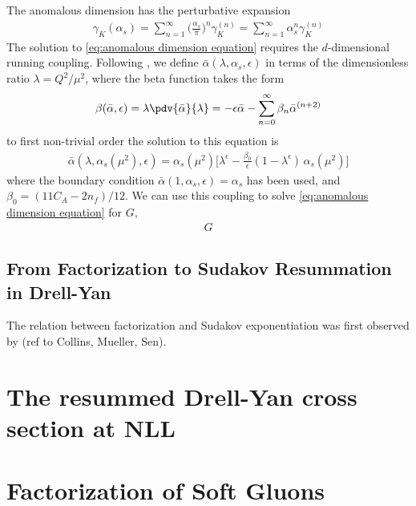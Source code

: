 The anomalous dimension has the perturbative expansion
\begin{align}
    \gamma_{K}(\alpha_s)=\sum_{n=1}^{\infty}\Big(\frac{\alpha_s}{\pi}\Big)^{n}\gamma_{K}^{(n)}=\sum_{n=1}^{\infty}\alpha_{s}^{n}\gamma_{K}^{(n)}
\end{align}
The solution to \cref{eq:anomalous dimension equation} requires the $d$-dimensional running coupling. Following \cite{Contopanagos:1996nh}, we define $\bar{\alpha}(\lambda,\alpha_s,\epsilon)$ in terms of the dimensionless ratio $\lambda=Q^{2}/\mu^{2}$, where the beta function takes the form
\begin{align}
    \beta(\bar{\alpha},\epsilon)=\lambda\pdv{\bar{\alpha}}{\lambda}=-\epsilon\bar{\alpha}-\sum_{n=0}^{\infty}\beta_{n}\bar{\alpha}^{(n+2)}
\end{align}
to first non-trivial order the solution to this equation is
\begin{align}
    \bar{\alpha}(\lambda,\alpha_s(\mu^{2}),\epsilon)=\alpha_{s}(\mu^{2})\Big[\lambda^{\epsilon}-\frac{\beta_{0}}{\epsilon}(1-\lambda^{\epsilon})\,\alpha_{s}(\mu^{2})\Big]
\end{align}
where the boundary condition $\bar{\alpha}(1,\alpha_s,\epsilon)=\alpha_s$ has been used, and $\beta_{0}=(11C_{A}-2n_{f})/12$. We can use this coupling to solve \cref{eq:anomalous dimension equation} for $G$,
\begin{align}
    G
\end{align}


\subsection{From Factorization to Sudakov Resummation in Drell-Yan}\label{sec:Sudakov Resummation Drell-Yan}
The relation between factorization and Sudakov exponentiation was first observed by (ref to Collins, Mueller, Sen). 





\section{The resummed Drell-Yan cross section at NLL}


\section{Factorization of Soft Gluons}


